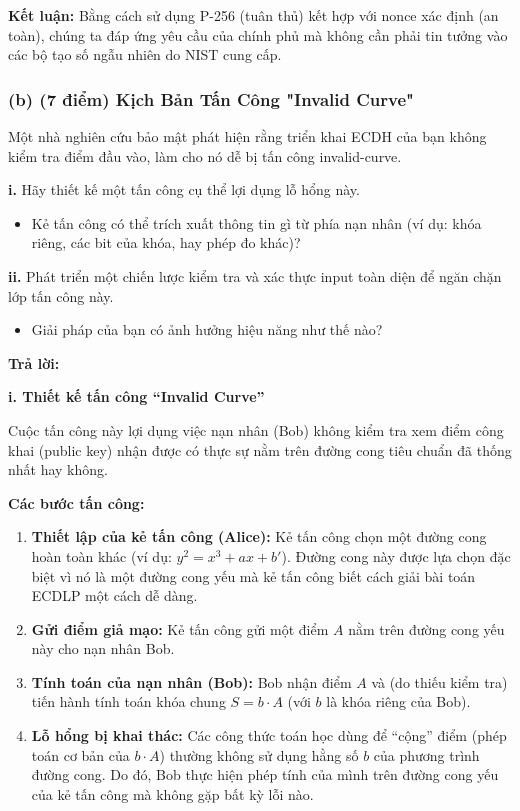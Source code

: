 \textbf{Kết luận:} Bằng cách sử dụng P-256 (tuân thủ) kết hợp với nonce xác định (an toàn), chúng ta đáp ứng yêu cầu của chính phủ mà không cần phải tin tưởng vào các bộ tạo số ngẫu nhiên do NIST cung cấp.

\subsubsection{(b) (7 điểm) Kịch Bản Tấn Công "Invalid Curve"}

Một nhà nghiên cứu bảo mật phát hiện rằng triển khai ECDH của bạn không kiểm tra điểm đầu vào, làm cho nó dễ bị tấn công invalid-curve.

\textbf{i.} Hãy thiết kế một tấn công cụ thể lợi dụng lỗ hổng này.
\begin{itemize}
    \item Kẻ tấn công có thể trích xuất thông tin gì từ phía nạn nhân (ví dụ: khóa riêng, các bit của khóa, hay phép đo khác)?
\end{itemize}

\textbf{ii.} Phát triển một chiến lược kiểm tra và xác thực input toàn diện để ngăn chặn lớp tấn công này.
\begin{itemize}
    \item Giải pháp của bạn có ảnh hưởng hiệu năng như thế nào?
\end{itemize}

\begin{center}
    \textbf{Trả lời:}
\end{center}

\textbf{i. Thiết kế tấn công ``Invalid Curve''}

Cuộc tấn công này lợi dụng việc nạn nhân (Bob) không kiểm tra xem điểm công khai (public key) nhận được có thực sự nằm trên đường cong tiêu chuẩn đã thống nhất hay không.

\textbf{Các bước tấn công:}

\begin{enumerate}
    \item \textbf{Thiết lập của kẻ tấn công (Alice):} Kẻ tấn công chọn một đường cong hoàn toàn khác (ví dụ: $y^2 = x^3 + ax + b'$). Đường cong này được lựa chọn đặc biệt vì nó là một đường cong yếu mà kẻ tấn công biết cách giải bài toán ECDLP một cách dễ dàng.
    
    \item \textbf{Gửi điểm giả mạo:} Kẻ tấn công gửi một điểm $A$ nằm trên đường cong yếu này cho nạn nhân Bob.
    
    \item \textbf{Tính toán của nạn nhân (Bob):} Bob nhận điểm $A$ và (do thiếu kiểm tra) tiến hành tính toán khóa chung $S = b \cdot A$ (với $b$ là khóa riêng của Bob).
    
    \item \textbf{Lỗ hổng bị khai thác:} Các công thức toán học dùng để ``cộng'' điểm (phép toán cơ bản của $b \cdot A$) thường không sử dụng hằng số $b$ của phương trình đường cong. Do đó, Bob thực hiện phép tính của mình trên đường cong yếu của kẻ tấn công mà không gặp bất kỳ lỗi nào.
\end{enumerate}

